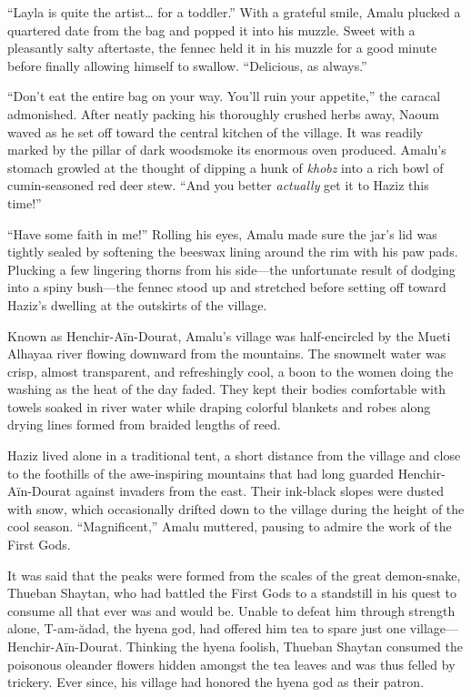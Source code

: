 ``Layla is quite the artist\ldots{} for a toddler.'' With a grateful smile, Amalu plucked a quartered date from the bag and popped it into his muzzle. Sweet with a pleasantly salty aftertaste, the fennec held it in his muzzle for a good minute before finally allowing himself to swallow. ``Delicious, as always.''

``Don't eat the entire bag on your way. You'll ruin your appetite,'' the caracal admonished. After neatly packing his thoroughly crushed herbs away, Naoum waved as he set off toward the central kitchen of the village. It was readily marked by the pillar of dark woodsmoke its enormous oven produced. Amalu's stomach growled at the thought of dipping a hunk of \emph{khobz} into a rich bowl of cumin-seasoned red deer stew. ``And you better \emph{actually} get it to Haziz this time!''

``Have some faith in me!'' Rolling his eyes, Amalu made sure the jar's lid was tightly sealed by softening the beeswax lining around the rim with his paw pads. Plucking a few lingering thorns from his side---the unfortunate result of dodging into a spiny bush---the fennec stood up and stretched before setting off toward Haziz's dwelling at the outskirts of the village.

Known as Henchir-Aïn-Dourat, Amalu's village was half-encircled by the Mueti Alhayaa river flowing downward from the mountains. The snowmelt water was crisp, almost transparent, and refreshingly cool, a boon to the women doing the washing as the heat of the day faded. They kept their bodies comfortable with towels soaked in river water while draping colorful blankets and robes along drying lines formed from braided lengths of reed.

Haziz lived alone in a traditional tent, a short distance from the village and close to the foothills of the awe-inspiring mountains that had long guarded Henchir-Aïn-Dourat against invaders from the east. Their ink-black slopes were dusted with snow, which occasionally drifted down to the village during the height of the cool season. ``Magnificent,'' Amalu muttered, pausing to admire the work of the First Gods.

It was said that the peaks were formed from the scales of the great demon-snake, Thueban Shaytan, who had battled the First Gods to a standstill in his quest to consume all that ever was and would be. Unable to defeat him through strength alone, T-am-ădad, the hyena god, had offered him tea to spare just one village---Henchir-Aïn-Dourat. Thinking the hyena foolish, Thueban Shaytan consumed the poisonous oleander flowers hidden amongst the tea leaves and was thus felled by trickery. Ever since, his village had honored the hyena god as their patron.

